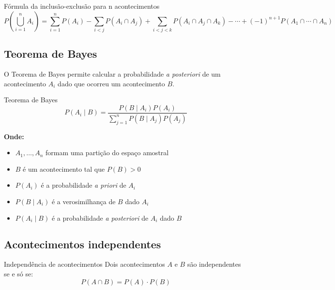 \documentclass[a4paper,12pt]{article}
\begin{document}
\begin{formulabox}{Fórmula da inclusão-exclusão para n acontecimentos}
\begin{equation}\label{formula3}\tag{Fórmula 3}
P\left(\bigcup_{i=1}^n A_i\right) = \sum_{i=1}^n P(A_i) - \sum_{i<j} P(A_i \cap A_j) + \sum_{i<j<k} P(A_i \cap A_j \cap A_k) - \cdots + (-1)^{n+1} P(A_1 \cap \cdots \cap A_n)
\end{equation}
\end{formulabox}

\subsection{Teorema de Bayes}

O Teorema de Bayes permite calcular a probabilidade \textit{a posteriori} de um acontecimento $A_i$ dado que ocorreu um acontecimento $B$.

\begin{formulabox}{Teorema de Bayes}
\begin{equation}\label{formula4}\tag{Fórmula 4}
    P(A_i \mid B) = \frac{P(B \mid A_i) P(A_i)}{\sum\limits_{j=1}^n P(B \mid A_j) P(A_j)}
\end{equation}

\textbf{Onde:}
\begin{itemize}
    \item $A_1, \ldots, A_n$ formam uma partição do espaço amostral
    \item $B$ é um acontecimento tal que $P(B) > 0$
    \item $P(A_i)$ é a probabilidade \textit{a priori} de $A_i$
    \item $P(B \mid A_i)$ é a verosimilhança de $B$ dado $A_i$
    \item $P(A_i \mid B)$ é a probabilidade \textit{a posteriori} de $A_i$ dado $B$
\end{itemize}
\end{formulabox}

\subsection{Acontecimentos independentes}

\begin{formulabox}{Independência de acontecimentos}
Dois acontecimentos $A$ e $B$ são independentes se e só se:
\begin{equation}\label{formula5}\tag{Fórmula 5}
    P(A \cap B) = P(A) \cdot P(B)
\end{equation}
\end{formulabox}
\end{document}

